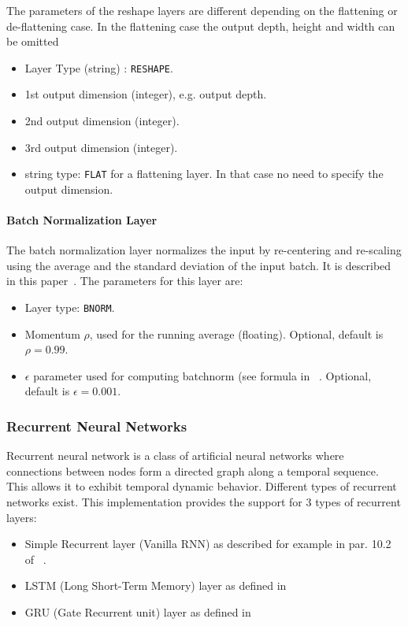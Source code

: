 { The parameters of the reshape layers are different depending on the flattening or de-flattening case. In the flattening case the output depth, height and width can be omitted


 \begin{itemize}
\item Layer Type (string) :  {\tt RESHAPE}.
\item 1st output dimension (integer), e.g. output depth.
\item 2nd output dimension  (integer). 
\item 3rd output dimension (integer). 
\item string type: {\tt FLAT} for a flattening layer. In that case no need to specify the output dimension. 
\end{itemize}


\paragraph{Batch Normalization Layer}

The batch normalization layer normalizes the input by re-centering and re-scaling using the average and the standard deviation of the input batch. It is described in this paper~\cite{batch-norm}.
The parameters for this layer are:
\begin{itemize}
\item Layer type: {\tt BNORM}.
\item Momentum $\rho$, used for the running average (floating). Optional, default is $\rho = 0.99$.
\item $\epsilon$ parameter used for computing batchnorm (see formula in ~\cite{batch-norm}. Optional, default is $\epsilon=0.001$.
 \end{itemize}




\subsubsection{Recurrent Neural Networks }
\label {sec:rnn}

Recurrent neural network is a class of artificial neural networks where connections between nodes form a directed graph along a temporal sequence. This allows it to exhibit temporal dynamic
behavior. Different types of recurrent networks exist.
This implementation provides the support for 3 types of recurrent layers:
\begin{itemize}
\item Simple Recurrent layer (Vanilla RNN) as described for example in par. 10.2 of ~\cite{deeplearning_book}.
\item LSTM (Long Short-Term Memory) layer as defined in ~\cite{lstm}
\item GRU (Gate Recurrent unit) layer as defined in ~\cite{gru}
\end{itemize}

}
